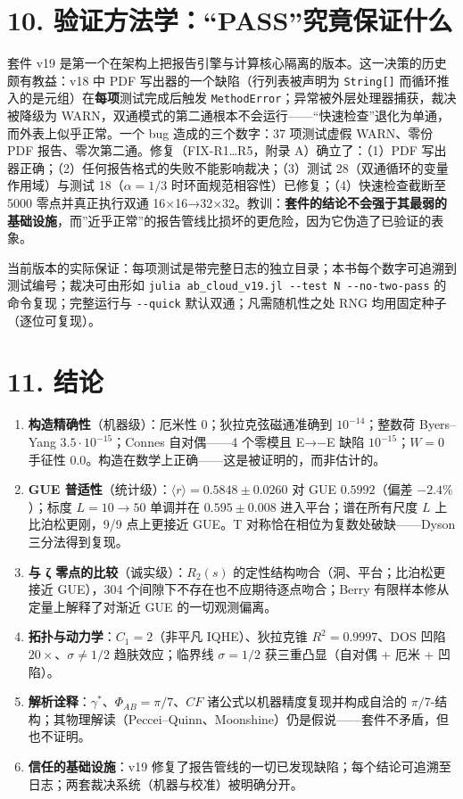 \documentclass[
]{article}
\providecommand{\tightlist}{%
  \setlength{\itemsep}{0pt}\setlength{\parskip}{0pt}}
\begin{document}
\section{10.
验证方法学：``PASS''究竟保证什么}\label{ux9a8cux8bc1ux65b9ux6cd5ux5b66passux7a76ux7adfux4fddux8bc1ux4ec0ux4e48}

套件 v19
是第一个在架构上把报告引擎与计算核心隔离的版本。这一决策的历史颇有教益：v18
中 PDF 写出器的一个缺陷（行列表被声明为 \texttt{String{[}{]}}
而循环推入的是元组）在\textbf{每项}测试完成后触发
\texttt{MethodError}；异常被外层处理器捕获，裁决被降级为
WARN，双通模式的第二通根本不会运行------``快速检查''退化为单通，而外表上似乎正常。一个
bug 造成的三个数字：37 项测试虚假 WARN、零份 PDF
报告、零次第二通。修复（FIX-R1\ldots R5，附录 A）确立了：（1）PDF
写出器正确；（2）任何报告格式的失败不能影响裁决；（3）测试
28（双通循环的变量作用域）与测试 18（\(\alpha=1/3\)
时环面规范相容性）已修复；（4）快速检查截断至 5000 零点并真正执行双通
16×16→32×32。教训：\textbf{套件的结论不会强于其最弱的基础设施}，而''近乎正常''的报告管线比损坏的更危险，因为它伪造了已验证的表象。

当前版本的实际保证：每项测试是带完整日志的独立目录；本书每个数字可追溯到测试编号；裁决可由形如
\texttt{julia\ ab\_cloud\_v19.jl\ -\/-test\ N\ -\/-no-two-pass}
的命令复现；完整运行与 \texttt{-\/-quick} 默认双通；凡需随机性之处 RNG
均用固定种子（逐位可复现）。

\section{11. 结论}\label{ux7ed3ux8bba}

\begin{enumerate}
\def\labelenumi{\arabic{enumi}.}
\tightlist
\item
  \textbf{构造精确性}（机器级）：厄米性 0；狄拉克弦磁通准确到
  \(10^{-14}\)；整数荷 Byers--Yang \(3.5\cdot10^{-15}\)；Connes
  自对偶------4 个零模且 E→−E 缺陷 \(10^{-15}\)；\(W=0\) 手征性
  \(0.0\)。构造在数学上正确------这是被证明的，而非估计的。
\item
  \textbf{GUE 普适性}（统计级）：\(\langle r\rangle = 0.5848\pm0.0260\)
  对 GUE \(0.5992\)（偏差 \(-2.4\%\)）；标度 \(L=10\to50\) 单调并在
  \(0.595\pm0.008\) 进入平台；谱在所有尺度 \(L\) 上比泊松更刚，9/9
  点上更接近 GUE。T 对称恰在相位为复数处破缺------Dyson 三分法得到复现。
\item
  \textbf{与 ζ 零点的比较}（诚实级）：\(R_2(s)\)
  的定性结构吻合（洞、平台；比泊松更接近 GUE），304
  个间隙下不存在也不应期待逐点吻合；Berry 有限样本修从定量上解释了对渐近
  GUE 的一切观测偏离。
\item
  \textbf{拓扑与动力学}：\(C_1=2\)（非平凡 IQHE）、狄拉克锥
  \(R^2=0.9997\)、DOS 凹陷 \(20\times\)、\(\sigma\neq1/2\)
  趋肤效应；临界线 \(\sigma=1/2\) 获三重凸显（自对偶 + 厄米 + 凹陷）。
\item
  \textbf{解析诠释}：\(\gamma^{\ast}\)、\(\Phi_{AB}=\pi/7\)、\(CF\)
  诸公式以机器精度复现并构成自洽的
  \(\pi/7\)-结构；其物理解读（Peccei--Quinn、Moonshine）仍是假说------套件不矛盾，但也不证明。
\item
  \textbf{信任的基础设施}：v19
  修复了报告管线的一切已发现缺陷；每个结论可追溯至日志；两套裁决系统（机器与校准）被明确分开。
\end{enumerate}
\end{document}
